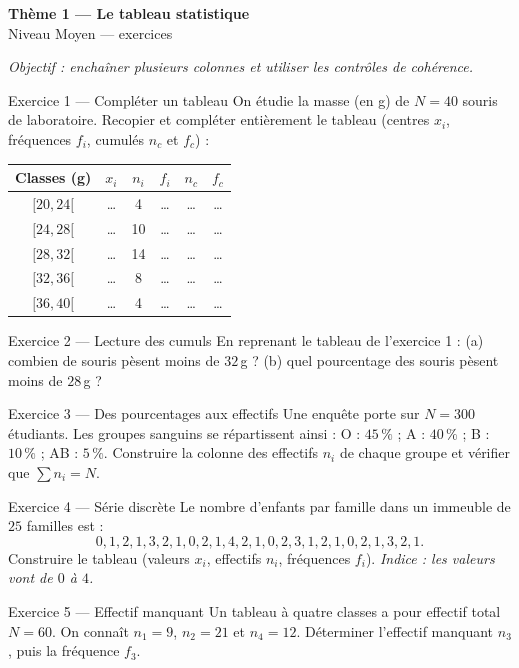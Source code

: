 \documentclass[11pt,a4paper]{article}
\newcommand{\bandeau}[2]{%
\begin{tcolorbox}[boxbase,colback=primary,colframe=primarydark,halign=center,
   before skip=2pt,after skip=12pt]
{\LARGE\bfseries\color{white} #1}\\[3pt]{\normalsize\color{white} #2}
\end{tcolorbox}}
\begin{document}
\bandeau{Thème 1 — Le tableau statistique}{Niveau Moyen — exercices}

\noindent\textit{Objectif : enchaîner plusieurs colonnes et utiliser les contrôles de cohérence.}\medskip

\begin{exobox}{Exercice 1 — Compléter un tableau}
On étudie la masse (en g) de $N=40$ souris de laboratoire.
Recopier et compléter entièrement le tableau (centres $x_i$, fréquences $f_i$, cumulés $n_c$ et $f_c$) :
\begin{center}
\renewcommand{\arraystretch}{1.2}
\begin{tabular}{|c|c|c|c|c|c|}
\hline
Classes (g) & $x_i$ & $n_i$ & $f_i$ & $n_c$ & $f_c$ \\\hline
$[20,24[$ & \dots & 4  & \dots & \dots & \dots \\
$[24,28[$ & \dots & 10 & \dots & \dots & \dots \\
$[28,32[$ & \dots & 14 & \dots & \dots & \dots \\
$[32,36[$ & \dots & 8  & \dots & \dots & \dots \\
$[36,40[$ & \dots & 4  & \dots & \dots & \dots \\\hline
\end{tabular}
\end{center}
\end{exobox}

\begin{exobox}{Exercice 2 — Lecture des cumuls}
En reprenant le tableau de l'exercice 1 :
(a) combien de souris pèsent moins de $32$\,g ?
(b) quel pourcentage des souris pèsent moins de $28$\,g ?
\end{exobox}

\begin{exobox}{Exercice 3 — Des pourcentages aux effectifs}
Une enquête porte sur $N=300$ étudiants. Les groupes sanguins se répartissent ainsi :
O : $45\,\%$ ; A : $40\,\%$ ; B : $10\,\%$ ; AB : $5\,\%$.
Construire la colonne des effectifs $n_i$ de chaque groupe et vérifier que $\sum n_i=N$.
\end{exobox}

\begin{exobox}{Exercice 4 — Série discrète}
Le nombre d'enfants par famille dans un immeuble de $25$ familles est :
\[ 0,1,2,1,3,2,1,0,2,1,4,2,1,0,2,3,1,2,1,0,2,1,3,2,1. \]
Construire le tableau (valeurs $x_i$, effectifs $n_i$, fréquences $f_i$).
\emph{Indice : les valeurs vont de $0$ à $4$.}
\end{exobox}

\begin{exobox}{Exercice 5 — Effectif manquant}
Un tableau à quatre classes a pour effectif total $N=60$. On connaît $n_1=9$, $n_2=21$ et $n_4=12$.
Déterminer l'effectif manquant $n_3$, puis la fréquence $f_3$.
\end{exobox}
\end{document}
